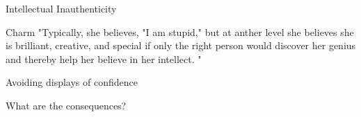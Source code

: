 \documentclass[aspectratio=169]{beamer}
\begin{document}
\begin{frame}
  \begin{center}
    \Huge Intellectual Inauthenticity
  \end{center}
\end{frame}

\begin{frame}
  \begin{center}
    \Huge Charm
    "Typically, she believes, "I am stupid," but at anther
    level  she  believes  she  is  brilliant,  creative,  and  special  if  only  the  right  person  would  discover
    her genius and thereby help her believe in her intellect. "
  \end{center}
\end{frame}

\begin{frame}
  \begin{center}
    \Huge Avoiding displays of confidence
  \end{center}
\end{frame}

\begin{frame}
  \begin{center}
    \Huge What are the consequences?
  \end{center}
\end{frame}
\end{document}
